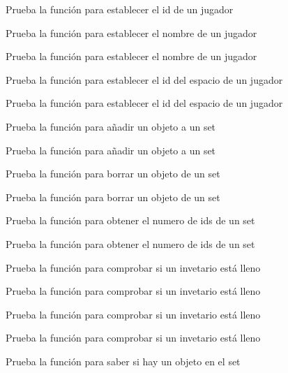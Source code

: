 \begin{DoxyRefList}
Prueba la función para establecer el id de un jugador  
\item[\label{test__test000207}%
\Hypertarget{test__test000207}%
Member \hyperlink{player__test_8h_a6e7ce8ff791f4bf63749df647a44263f}{test2\+\_\+player\+\_\+set\+\_\+name} ()]Prueba la función para establecer el nombre de un jugador 

Prueba la función para establecer el nombre de un jugador  
\item[\label{test__test000212}%
\Hypertarget{test__test000212}%
Member \hyperlink{player__test_8h_a7c56960ab99cd14862dda28c157339e3}{test2\+\_\+player\+\_\+set\+\_\+space\+\_\+id} ()]Prueba la función para establecer el id del espacio de un jugador 

Prueba la función para establecer el id del espacio de un jugador  
\item[\label{test__test000232}%
\Hypertarget{test__test000232}%
Member \hyperlink{set__test_8h_ab09827322a313bf97b9757c98c2bdbb0}{test2\+\_\+set\+\_\+add} ()]Prueba la función para añadir un objeto a un set 

Prueba la función para añadir un objeto a un set  
\item[\label{test__test000229}%
\Hypertarget{test__test000229}%
Member \hyperlink{set__test_8h_ac96b1e7b6602e3e491422053a43f08f6}{test2\+\_\+set\+\_\+delete\+\_\+element} ()]Prueba la función para borrar un objeto de un set 

Prueba la función para borrar un objeto de un set  
\item[\label{test__test000240}%
\Hypertarget{test__test000240}%
Member \hyperlink{set__test_8h_aaadf761f34e98a3a6d214cc2598ee852}{test2\+\_\+set\+\_\+get\+\_\+num\+\_\+ids} ()]Prueba la función para obtener el numero de ids de un set 

Prueba la función para obtener el numero de ids de un set  
\item[\label{test__test000236}%
\Hypertarget{test__test000236}%
Member \hyperlink{set__test_8h_a13000e62535d3341e070963f4f3907ec}{test2\+\_\+set\+\_\+is\+\_\+empty} ()]Prueba la función para comprobar si un invetario está lleno 

Prueba la función para comprobar si un invetario está lleno  
\item[\label{test__test000234}%
\Hypertarget{test__test000234}%
Member \hyperlink{set__test_8h_ab1de430f3e313725897f9b0b1aba543b}{test2\+\_\+set\+\_\+is\+\_\+full} ()]Prueba la función para comprobar si un invetario está lleno 

Prueba la función para comprobar si un invetario está lleno  
\item[\label{test__test000238}%
\Hypertarget{test__test000238}%
Member \hyperlink{set__test_8h_af068866754cc693dee41ee757c5ee4a2}{test2\+\_\+set\+\_\+is\+\_\+id\+\_\+in} ()]Prueba la función para saber si hay un objeto en el set 


\end{DoxyRefList}
